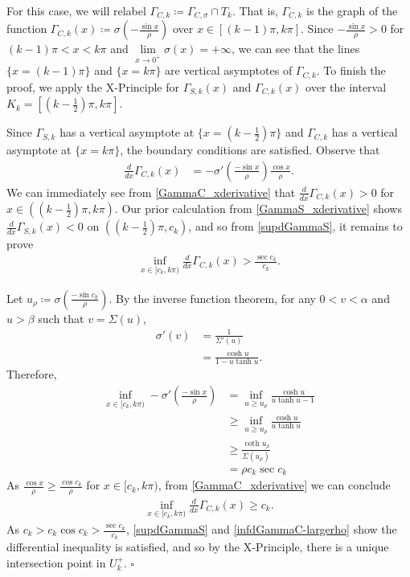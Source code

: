 \documentclass{amsart}
\theoremstyle{plain}
\numberwithin{theorem}{section}
\theoremstyle{definition}
\theoremstyle{remark}
\theoremstyle{brakets}
\begin{document}
For this case, we will relabel $\Gamma_{C,k} \coloneq \Gamma_{C,\sigma} \cap T_k$. That is, $\Gamma_{C,k}$ is the graph of the function $\Gamma_{C,k}(x) \coloneq \sigma(-\frac{\sin x}{\rho})$ over $x \in [(k-1)\pi,k\pi]$. Since $-\frac{\sin x}{\rho} > 0$ for $(k-1)\pi < x < k\pi$ and $\lim\limits_{x \to 0^+} \sigma(x) = +\infty$, we can see that the lines $\{x = (k-1)\pi\}$ and $\{x = k\pi\}$ are vertical asymptotes of $\Gamma_{C,k}$. To finish the proof, we apply the X-Principle for $\Gamma_{S,k}(x)$ and $\Gamma_{C,k}(x)$ over the interval $K_k = [(k-\frac{1}{2})\pi,k\pi]$.

Since $\Gamma_{S,k}$ has a vertical asymptote at $\{x = (k-\frac{1}{2})\pi\}$ and $\Gamma_{C,k}$ has a vertical asymptote at $\{x = k\pi\}$, the boundary conditions are satisfied. Observe that 
\begin{align}
    \frac{d}{dx}\Gamma_{C,k}(x) &= -\sigma'\left( \frac{-\sin x}{\rho} \right) \frac{\cos x}{\rho} \label{GammaC_xderivative}.
\end{align}
\noindent We can immediately see from \eqref{GammaC_xderivative} that $\frac{d}{dx}\Gamma_{C,k}(x) > 0$ for $x \in ((k-\frac{1}{2})\pi,k\pi)$. Our prior calculation from \eqref{GammaS_xderivative} shows $\frac{d}{dx}\Gamma_{S,k}(x) < 0$ on $((k-\frac{1}{2})\pi,c_k)$, and so from \eqref{supdGammaS}, it remains to prove 
\begin{align*}
    \inf\limits_{x \in [c_k, k\pi)}  \frac{d}{dx}\Gamma_{C,k}(x)  > \frac{\sec c_k}{c_k}.
\end{align*}

Let $u_\rho \coloneq \sigma(\frac{-\sin c_k}{\rho})$. By the inverse function theorem, for any $0 < v < \alpha$ and $u > \beta$ such that $v = \Sigma(u)$,
\begin{align*}
    \sigma'(v) &= \frac{1}{\Sigma'(u)} \\
    &= \frac{\cosh u}{1 - u\tanh u}.
\end{align*}
\noindent Therefore,
\begin{align*}
    \inf\limits_{x \in [c_k,k\pi)} -\sigma'\left( \frac{-\sin x}{\rho} \right) &= \inf\limits_{u \geq u_\rho} \frac{\cosh u}{u\tanh u - 1} \\
    &\geq \inf\limits_{u \geq u_\rho} \frac{\cosh u}{u\tanh u} \\
    &\geq \frac{\coth u_\rho}{\Sigma(u_\rho)} \\
    &= \rho c_k \sec c_k
\end{align*}
As $\frac{\cos x}{\rho} \geq \frac{\cos c_k}{\rho}$ for $x \in [c_k,k\pi)$, from \eqref{GammaC_xderivative} we can conclude 
\begin{align}
     \inf\limits_{x \in [c_k, k\pi)}  \frac{d}{dx}\Gamma_{C,k}(x) \geq c_k. \label{infdGammaC-largerho}
\end{align}
As $c_k > c_k\cos c_k > \frac{\sec c_k}{c_k}$, \eqref{supdGammaS} and \eqref{infdGammaC-largerho} show the differential inequality is satisfied, and so by the X-Principle, there is a unique intersection point in $U_k^+$. $\square$
\end{document}
